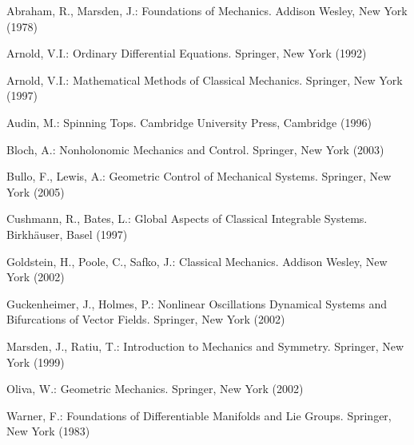 \RGReferenceSection

\begin{description}[style=multiline,leftmargin=5em,labelwidth=4.5em,font=\normalfont]
\item[{[AM78]}]Abraham, R., Marsden, J.: Foundations of Mechanics. Addison Wesley, New York (1978)
\item[{[Arn92]}]Arnold, V.I.: Ordinary Differential Equations. Springer, New York (1992)
\item[{[Arn97]}]Arnold, V.I.: Mathematical Methods of Classical Mechanics. Springer, New York (1997)
\item[{[Aud96]}]Audin, M.: Spinning Tops. Cambridge University Press, Cambridge (1996)
\item[{[Blo03]}]Bloch, A.: Nonholonomic Mechanics and Control. Springer, New York (2003)
\item[{[BL05]}]Bullo, F., Lewis, A.: Geometric Control of Mechanical Systems. Springer, New York (2005)
\item[{[CB97]}]Cushmann, R., Bates, L.: Global Aspects of Classical Integrable Systems.\newline
  Birkhäuser, Basel (1997)
\item[{[GPS02]}]Goldstein, H., Poole, C., Safko, J.: Classical Mechanics. Addison Wesley, New York (2002)
\item[{[GH02]}]Guckenheimer, J., Holmes, P.: Nonlinear Oscillations Dynamical Systems and Bifurcations of Vector Fields. Springer, New York (2002)
\item[{[MR99]}]Marsden, J., Ratiu, T.: Introduction to Mechanics and Symmetry. Springer, New York (1999)
\item[{[Oli02]}]Oliva, W.: Geometric Mechanics. Springer, New York (2002)
\item[{[War83]}]Warner, F.: Foundations of Differentiable Manifolds and Lie Groups. Springer, New York (1983)
\end{description}
